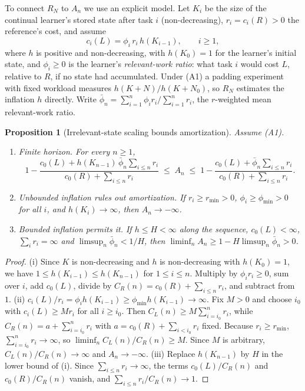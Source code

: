 \documentclass[11pt]{article}
\newtheorem{proposition}{Proposition}
\theoremstyle{remark}
\begin{document}
To connect $R_N$ to $A_n$ we use an explicit model. Let $K_i$ be the size of the continual learner's stored state after task $i$ (non-decreasing), $r_i=c_i(R)>0$ the reference's cost, and assume
\begin{equation}
c_i(L)=\phi_i\,r_i\,h(K_{i-1}),\qquad i\ge1, \tag{A1}
\end{equation}
where $h$ is positive and non-decreasing, with $h(K_0)=1$ for the learner's initial state, and $\phi_i\ge0$ is the learner's \emph{relevant-work ratio}: what task $i$ would cost $L$, relative to $R$, if no state had accumulated. Under (A1) a padding experiment with fixed workload measures $h(K+N)/h(K+N_0)$, so $R_N$ estimates the inflation $h$ directly. Write $\bar\phi_n=\sum_{i=1}^n\phi_ir_i/\sum_{i=1}^n r_i$, the $r$-weighted mean relevant-work ratio.

\begin{proposition}[Irrelevant-state scaling bounds amortization]\label{prop:scaling}
Assume (A1).
\begin{enumerate}[label=(\roman*),itemsep=1pt]
\item \emph{Finite horizon.} For every $n\ge1$,
\[
1-\frac{c_0(L)+h(K_{n-1})\,\bar\phi_n\sum_{i\le n}r_i}{c_0(R)+\sum_{i\le n}r_i}\;\le\;A_n\;\le\;1-\frac{c_0(L)+\bar\phi_n\sum_{i\le n}r_i}{c_0(R)+\sum_{i\le n}r_i}.
\]
\item \emph{Unbounded inflation rules out amortization.} If $r_i\ge r_{\min}>0$, $\phi_i\ge\phi_{\min}>0$ for all $i$, and $h(K_i)\to\infty$, then $A_n\to-\infty$.
\item \emph{Bounded inflation permits it.} If $h\le H<\infty$ along the sequence, $c_0(L)<\infty$, $\sum_i r_i=\infty$ and $\limsup_n\bar\phi_n<1/H$, then $\liminf_n A_n\ge 1-H\limsup_n\bar\phi_n>0$.
\end{enumerate}
\end{proposition}
\begin{proof}
(i) Since $K$ is non-decreasing and $h$ is non-decreasing with $h(K_0)=1$, we have $1\le h(K_{i-1})\le h(K_{n-1})$ for $1\le i\le n$. Multiply by $\phi_ir_i\ge0$, sum over $i$, add $c_0(L)$, divide by $C_R(n)=c_0(R)+\sum_{i\le n}r_i$, and subtract from $1$.
(ii) $c_i(L)/r_i=\phi_ih(K_{i-1})\ge\phi_{\min}h(K_{i-1})\to\infty$. Fix $M>0$ and choose $i_0$ with $c_i(L)\ge Mr_i$ for all $i\ge i_0$. Then $C_L(n)\ge M\sum_{i=i_0}^n r_i$, while $C_R(n)=a+\sum_{i=i_0}^n r_i$ with $a=c_0(R)+\sum_{i<i_0}r_i$ fixed. Because $r_i\ge r_{\min}$, $\sum_{i=i_0}^n r_i\to\infty$, so $\liminf_n C_L(n)/C_R(n)\ge M$. Since $M$ is arbitrary, $C_L(n)/C_R(n)\to\infty$ and $A_n\to-\infty$.
(iii) Replace $h(K_{n-1})$ by $H$ in the lower bound of (i). Since $\sum_{i\le n}r_i\to\infty$, the terms $c_0(L)/C_R(n)$ and $c_0(R)/C_R(n)$ vanish, and $\sum_{i\le n}r_i/C_R(n)\to1$.
\end{proof}
\end{document}
